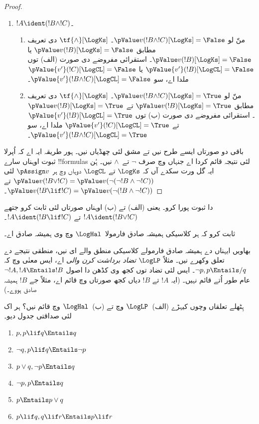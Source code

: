 \documentclass[../../../include/open-logic-section]{subfiles}
\begin{document}
\begin{proof}
\begin{enumerate}
    \item $!A \ident (!B \land !C)$۔
    \begin{enumerate}
      \item منّ لو $\pValue v(!B \land !C)[\LogKs] = \False$۔
      $\tf{\land}[\LogKs]$ دی تعریف مطابق $\pValue v(!B)[\LogKs]  =
      \False$ یا $\pValue v(!B)[\LogKs]  = \False$۔ استقرائی
      مفروضے دی صورت (الف) توں $\pValue {v'}(!B)[\LogCL]  = \False$
      یا $\pValue {v'}(!C)[\LogCL]  = \False$ ملدا اے، سو $\pValue {v'}(!B \land
      !C)[\LogCL] = \False$۔
      \item منّ لو $\pValue v(!B \land !C)[\LogKs] = \True$۔
      $\tf{\land}[\LogKs]$ دی تعریف مطابق $\pValue v(!B)[\LogKs]  =
      \True$ تے $\pValue v(!B)[\LogKs]  = \True$۔ استقرائی
      مفروضے دی صورت (ب) توں $\pValue {v'}(!B)[\LogCL]  = \True$
      تے $\pValue {v'}(!C)[\LogCL]  = \True$ ملدا اے، سو $\pValue {v'}(!B \land
      !C)[\LogCL] = \True$۔
    \end{enumerate}
  \end{enumerate}

  باقی دو صورتاں ایسے طرح نیں تے مشق لئی چھڈیاں نیں۔ ہور
  طریقہ ایہ اے کہ اُپرلا ثبوت اوہناں سارے !!{formula}s لئی
  نتیجہ قائم کردا اے جنہاں وچ صرف $\lnot$ تے~$\land$ نیں۔
  ہُن ایہ گل ورت سکدے آں کہ $\LogKs$ تے $\LogCL$ دوہاں
  وچ ہر $\pAssign v$ لئی $\pValue v(!B \lor
  !C) = \pValue v(\lnot(\lnot!B \land \lnot !C))$ تے $\pValue v(!B \lif
  !C) = \pValue v(\lnot(!B \land \lnot !C))$۔
\end{proof}

\begin{prob}
   دا ثبوت پورا کرو۔
  یعنی (الف) تے (ب) اوہناں صورتاں لئی ثابت کرو جتھے
  $!A \ident (!B \lor !C)$ تے $!A \ident (!B \lif !C)$۔
\end{prob}

\begin{prob}
ثابت کرو کہ ہر کلاسیکی ہمیشہ صادق فارمولا~$\LogHal$ وچ وی
ہمیشہ صادق اے۔
\end{prob}

بھاویں ایہناں دے ہمیشہ صادق فارمولے کلاسیکی منطق والے ای نیں،
منطقی نتیجے دے تعلق وکھرے نیں۔ مثلاً $\LogLP$
\emph{تضاد برداشت کرن والی} اے، ایس معنٰی وچ کہ
$\lnot p, p \Entails/ q$۔ ایس لئی تضاد توں کجھ وی کڈھن دا
اصول $\lnot !A, !A \Entails !B$ عام طور اُتے قائم نہیں۔
(ایہ $!A$ تے $!B$ دیاں کجھ صورتاں وچ قائم اے، مثلاً جے
$!B$ ہمیشہ صادق ہووے۔)

\begin{prob}
  ہِٹھلے تعلقاں وچوں کیہڑے (الف)~$\LogLP$ وچ تے (ب)~$\LogHal$
  وچ قائم نیں؟ ہر اک لئی صداقتی جدول دیو۔
  \begin{enumerate}
    \item $p, p \lif q \Entails q$
    \item $\lnot q, p \lif q \Entails \lnot p$
    \item $p \lor q, \lnot p \Entails q$
    \item $\lnot p, p \Entails q$
    \item $p \Entails p \lor q$
    \item $p \lif q, q\lif r \Entails p \lif r$
  \end{enumerate}
\end{prob}
\end{document}
